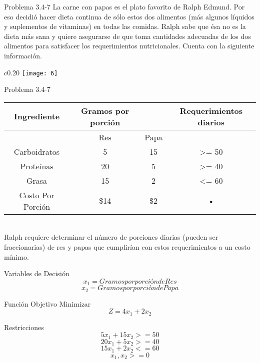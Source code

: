 \documentclass{beamer}
\begin{document}
\begin{frame}[t,fragile]{Problema 3.4-7}
La carne con papas es el plato favorito de Ralph Edmund. Por eso decidió hacer dieta continua de sólo estos dos alimentos (más algunos líquidos y suplementos de vitaminas) en todas las comidas. Ralph sabe que ésa no es la dieta más sana y quiere asegurarse de que toma cantidades adecuadas de  los dos alimentos para satisfacer los requerimientos nutricionales. Cuenta con la siguiente información.\begin{wrapfigure}{c}{0.20\textwidth}
    \centering
    \texttt{[image: 6]}
\end{wrapfigure}
\end{frame}
\begin{frame}[t,fragile]{Problema 3.4-7}

\begin{tabular}{|c|c|c|c|}
\hline 
Ingrediente & Gramos por porción &   & Requerimientos diarios\\ 
\hline 
  & Res & Papa &   \\ 
\hline 
Carboidratos & 5 & 15 & >= 50 \\ 
\hline 
Proteínas & 20 & 5 & >= 40 \\ 
\hline 
Grasa & 15 & 2 & <= 60 \\ 
\hline 
Costo Por Porción & \$14 & \$2 & • \\ 
\hline 
\end{tabular} \\
Ralph requiere determinar el número de porciones diarias (pueden ser fraccionarias) de res y  papas que cumplirían con estos requerimientos a un costo mínimo.
\end{frame}

\begin{frame}[fragile]{Variables de Decisión}
\[x_{1} = Gramos por porción de Res\]
\[x_{2} = Gramos por porción de Papa\]

\end{frame}

\begin{frame}[fragile]{Función Objetivo}
Minimizar\\
\[Z = 4x_{1} + 2x_{2}\]

\end{frame}

\begin{frame}[fragile]{Restricciones}
\[5x_{1} + 15x_{2} >= 50\]
\[20x_{1} +5x_{2} >= 40\]
\[15x_{1} + 2x_{2} <=60\]
\[x_{1} , x_{2} >= 0\]

\end{frame}
\end{document}
